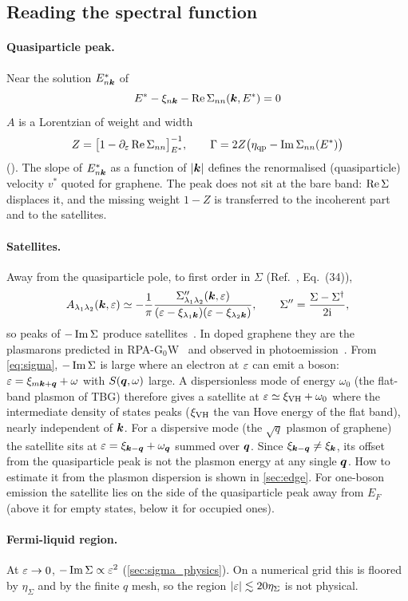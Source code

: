 \subsection{Reading the spectral function}

\paragraph{Quasiparticle peak.} Near the solution $E^*_{n\bm k}$ of
\begin{equation}
E^*-\xi_{n\bm k}-\operatorname{Re}\Sigma_{nn}(\bm k,E^*)=0
\end{equation}
$A$ is a Lorentzian of weight and width
\begin{equation}
Z=\bigl[1-\partial_\varepsilon\operatorname{Re}\Sigma_{nn}\bigr]^{-1}_{E^*},\qquad \Gamma=2Z\bigl(\eta_{\rm qp}-\operatorname{Im}\Sigma_{nn}(E^*)\bigr)
\end{equation}
(). The slope of $E^*_{n\bm k}$ as a function of $|\bm k|$ defines the renormalised
(quasiparticle) velocity $v^*$ quoted for graphene. The peak does not sit at the bare band: $\operatorname{Re}\Sigma$ displaces it, and
the missing weight $1-Z$ is transferred to the incoherent part and to the satellites.

\paragraph{Satellites.} Away from the quasiparticle pole, to first order in $\Sigma$ (Ref.~\cite{Wei2025}, Eq.~(34)),
\begin{equation}
A_{\lambda_1\lambda_2}(\bm k,\varepsilon)\simeq-\frac1\pi\frac{\Sigma''_{\lambda_1\lambda_2}(\bm k,\varepsilon)}{(\varepsilon-\xi_{\lambda_1\bm k})(\varepsilon-\xi_{\lambda_2\bm k})},
\qquad \Sigma''=\frac{\Sigma-\Sigma^\dagger}{2\mathrm i},
\end{equation}
so peaks of $-\operatorname{Im}\Sigma$ produce satellites~\cite{HedinLundqvist1970,AryasetiawanGunnarsson1998}. In doped graphene
they are the plasmarons predicted in RPA-G$_0$W~\cite{Polini2008,HwangDasSarma2008} and observed in
photoemission~\cite{Bostwick2010}. From \cref{eq:sigma}, $-\operatorname{Im}\Sigma$ is large where an electron at
$\varepsilon$ can emit a boson: $\varepsilon=\xi_{m\bm k+\bm q}+\omega$ with $S(\bm q,\omega)$ large. A dispersionless mode of energy
$\omega_0$ (the flat-band plasmon of TBG) therefore gives a satellite at $\varepsilon\simeq\xi_{\rm VH}+\omega_0$ where the
intermediate density of states peaks ($\xi_{\rm VH}$ the van Hove energy of the flat band), nearly independent of
$\bm k$. For a dispersive mode (the $\sqrt q$ plasmon of graphene) the satellite sits at $\varepsilon=\xi_{\bm k-\bm q}+\omega_{\bm q}$
summed over $\bm q$. Since $\xi_{\bm k-\bm q}\ne\xi_{\bm k}$, its offset from the quasiparticle peak is not the plasmon
energy at any single $\bm q$. How to estimate it from the plasmon dispersion is shown in \cref{sec:edge}. For one-boson
emission the satellite lies on the side of the quasiparticle peak away from $E_F$ (above it for empty states,
below it for occupied ones).

\paragraph{Fermi-liquid region.} At $\varepsilon\to0$, $-\operatorname{Im}\Sigma\propto\varepsilon^2$ (\cref{sec:sigma_physics}). On a numerical grid this is floored
by $\eta_\Sigma$ and by the finite $q$ mesh, so the region $|\varepsilon|\lesssim20\eta_\Sigma$ is not physical.
